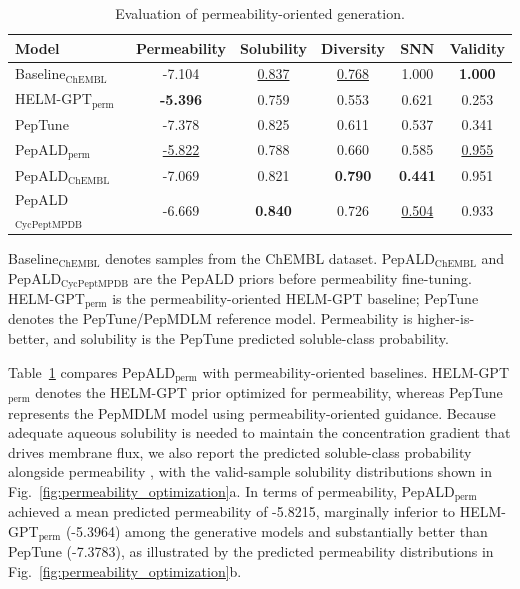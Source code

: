 \begin{table}[!b]
\centering
\small
\caption{Evaluation of permeability-oriented generation.}
\label{tab:permeability_models}
\setlength{\tabcolsep}{0pt}
\begin{tabular*}{\textwidth}{@{\extracolsep{\fill}}lccccc@{}}
\toprule
Model & Permeability & Solubility & Diversity & SNN & Validity \\
\midrule
Baseline$_{\mathrm{ChEMBL}}$ & -7.104 & \underline{0.837} & \underline{0.768} & 1.000 & \textbf{1.000} \\
HELM-GPT$_{\mathrm{perm}}$ & \textbf{-5.396} & 0.759 & 0.553 & 0.621 & 0.253 \\
PepTune & -7.378 & 0.825 & 0.611 & 0.537 & 0.341 \\
PepALD$_{\mathrm{perm}}$ & \underline{-5.822} & 0.788 & 0.660 & 0.585 & \underline{0.955} \\
PepALD$_{\mathrm{ChEMBL}}$ & -7.069 & 0.821 & \textbf{0.790} & \textbf{0.441} & 0.951 \\
PepALD$_{\mathrm{CycPeptMPDB}}$ & -6.669 & \textbf{0.840} & 0.726 & \underline{0.504} & 0.933 \\
\bottomrule
\end{tabular*}
\begin{flushleft}
\footnotesize Baseline$_{\mathrm{ChEMBL}}$ denotes samples from the ChEMBL dataset. PepALD$_{\mathrm{ChEMBL}}$ and PepALD$_{\mathrm{CycPeptMPDB}}$ are the PepALD priors before permeability fine-tuning. HELM-GPT$_{\mathrm{perm}}$ is the permeability-oriented HELM-GPT baseline; PepTune denotes the PepTune/PepMDLM reference model. Permeability is higher-is-better, and solubility is the PepTune predicted soluble-class probability.
\end{flushleft}
\end{table}
\setlength{\textfloatsep}{4pt plus 1pt minus 1pt}
Table~\ref{tab:permeability_models} compares PepALD$_{\mathrm{perm}}$ with permeability-oriented baselines.
HELM-GPT$_{\mathrm{perm}}$ denotes the HELM-GPT prior optimized for permeability, whereas PepTune represents the PepMDLM model using permeability-oriented guidance.
Because adequate aqueous solubility is needed to maintain the concentration gradient that drives membrane flux, we also report the predicted soluble-class probability alongside permeability \citep{ref_peptune}, with the valid-sample solubility distributions shown in Fig.~\ref{fig:permeability_optimization}a.
In terms of permeability, PepALD$_{\mathrm{perm}}$ achieved a mean predicted permeability of -5.8215, marginally inferior to HELM-GPT$_{\mathrm{perm}}$ (-5.3964) among the generative models and substantially better than PepTune (-7.3783), as illustrated by the predicted permeability distributions in Fig.~\ref{fig:permeability_optimization}b.
